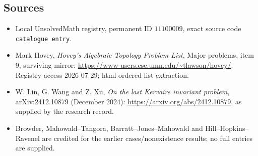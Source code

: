 \documentclass[11pt]{article}
\begin{document}
\subsection{Sources}
\begin{itemize}
\item Local UnsolvedMath registry, permanent ID \(11100009\), exact source code \texttt{catalogue entry}.
\item Mark Hovey, \emph{Hovey's Algebraic Topology Problem List}, Major problems, item 9, surviving mirror: \url{https://www-users.cse.umn.edu/~tlawson/hovey/}. Registry access 2026-07-29; html-ordered-list extraction.
\item W. Lin, G. Wang and Z. Xu, \emph{On the last Kervaire invariant problem}, arXiv:2412.10879 (December 2024): \url{https://arxiv.org/abs/2412.10879}, as supplied by the research record.
\item Browder, Mahowald--Tangora, Barratt--Jones--Mahowald and Hill--Hopkins--Ravenel are credited for the earlier cases/nonexistence results; no full entries are supplied.
\end{itemize}
\end{document}
